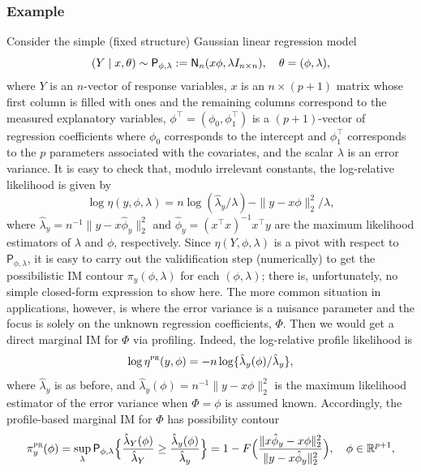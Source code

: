 \documentclass[12pt]{article}
\def\prob{\mathsf{P}}
\begin{document}
\subsubsection{Example}
\label{SSS:toy.example}

Consider the simple (fixed structure) Gaussian linear regression model 
\begin{equation} \label{eq:lm}
    (Y \mid x, \theta) \sim \prob_{\phi,\lambda} := {\sf N}_n(x\phi, \lambda I_{n \times n}), \quad \theta = (\phi, \lambda),
\end{equation}
where $Y$ is an $n$-vector of response variables, $x$ is an $n \times (p + 1)$ matrix whose first column is filled with ones and the remaining columns correspond to the measured explanatory variables, $\phi^\top = (\phi_0, \phi_1^\top)$ is a $(p+1)$-vector of regression coefficients where $\phi_0$ corresponds to the intercept and $\phi_1^\top$ corresponds to the $p$ parameters associated with the covariates, and the scalar $\lambda$ is an error variance.  It is easy to check that, modulo irrelevant constants, the log-relative likelihood is given by 
\[ \log \eta(y,\phi,\lambda) = n\log(\hat\lambda_y / \lambda) - \|y - x\phi\|_2^2 / \lambda, \]
where $\hat\lambda_y = n^{-1} \|y - x \hat\phi_y\|_2^2$ and $\hat\phi_y = (x^\top x)^{-1} x^\top y$ are the maximum likelihood estimators of $\lambda$ and $\phi$, respectively.  Since $\eta(Y,\phi,\lambda)$ is a pivot with respect to $\prob_{\phi,\lambda}$, it is easy to carry out the validification step (numerically) to get the possibilistic IM contour $\pi_y(\phi,\lambda)$ for each $(\phi,\lambda)$; there is, unfortunately, no simple closed-form expression to show here.  The more common situation in applications, however, is where the error variance is a nuisance parameter and the focus is solely on the unknown regression coefficients, $\Phi$.  Then we would get a direct marginal IM for $\Phi$ via profiling.  Indeed, the log-relative profile likelihood is 
\[ \log\eta^\text{\sc pr}(y,\phi) = -n \log\{ \hat\lambda_y(\phi) / \hat\lambda_y \}, \]
where $\hat\lambda_y$ is as before, and $\hat\lambda_y(\phi) = n^{-1} \|y - x\phi\|_2^2$ is the maximum likelihood estimator of the error variance when $\Phi=\phi$ is assumed known.  Accordingly, the profile-based marginal IM for $\Phi$ has possibility contour 
\[
\pi_y^\text{\sc pr}(\phi) = \sup_\lambda \prob_{\phi,\lambda} \Bigl\{ \frac{\hat\lambda_Y(\phi)}{\hat\lambda_Y} \geq \frac{\hat\lambda_y(\phi)}{\hat\lambda_y} \Bigr\} = 1 - F\Bigl( \frac{\|x\hat\phi_y - x\phi\|_2^2}{\|y - x\hat\phi_y\|_2^2} \Bigr), \quad \phi \in \mathbb{R}^{p+1},
\]
\end{document}
